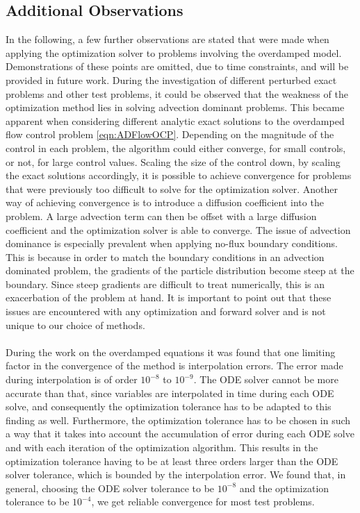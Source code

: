 \documentclass[11pt, a4paper]{article}
\theoremstyle{definition}
\begin{document}
	\subsection{Additional Observations}
	In the following, a few further observations are stated that were made when applying the optimization solver to problems involving the overdamped model. Demonstrations of these points are omitted, due to time constraints, and will be provided in future work.
	During the investigation of different perturbed exact problems and other test problems, it could be observed that the weakness of the optimization method lies in solving advection dominant problems. 
	This became apparent when considering different analytic exact solutions to the overdamped flow control problem \eqref{eqn:ADFlowOCP}. Depending on the magnitude of the control in each problem, the algorithm could either converge, for small controls, or not, for large control values. Scaling the size of the control down, by scaling the exact solutions accordingly, it is possible to achieve convergence for problems that were previously too difficult to solve for the optimization solver. Another way of achieving convergence is to introduce a diffusion coefficient into the problem. A large advection term can then be offset with a large diffusion coefficient and the optimization solver is able to converge.
	The issue of advection dominance is especially prevalent when applying no-flux boundary conditions. This is because in order to match the boundary conditions in an advection dominated problem, the gradients of the particle distribution become steep at the boundary. Since steep gradients are difficult to treat numerically, this is an exacerbation of the problem at hand.
	It is important to point out that these issues are encountered with any optimization and forward solver and is not unique to our choice of methods. 
	\\
	\\
	During the work on the overdamped equations it was found that one limiting factor in the convergence of the method is interpolation errors. The error made during interpolation is of order $10^{-8}$ to $10^{-9}$. The ODE solver cannot be more accurate than that, since variables are interpolated in time during each ODE solve, and consequently the optimization tolerance has to be adapted to this finding as well.
	Furthermore, the optimization tolerance has to be chosen in such a way that it takes into account the accumulation of error during each ODE solve and with each iteration of the optimization algorithm. This results in the optimization tolerance having to be at least three orders larger than the ODE solver tolerance, which is bounded by the interpolation error. We found that, in general, choosing the ODE solver tolerance to be $10^{-8}$ and the optimization tolerance to be $10^{-4}$, we get reliable convergence for most test problems.
\end{document}
